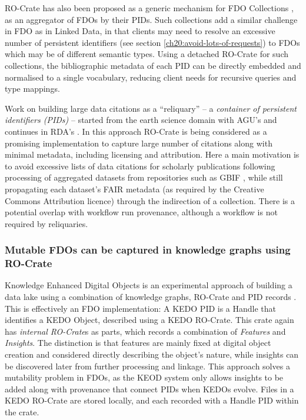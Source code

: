 RO-Crate has also been proposed as a generic mechanism for FDO Collections \cite{Soiland-Reyes 2023d}, as an aggregator of FDOs by their PIDs. Such collections add a similar challenge in FDO as in Linked Data, in that clients may need to resolve an excessive number of persistent identifiers (see section \vref{ch20:avoid-lots-of-requests}) to FDOs which may be of different semantic types. 
Using a detached RO-Crate for such collections, the bibliographic metadata of each PID can be directly embedded and normalised to a single vocabulary, reducing client needs for recursive queries and type mappings. 
 
Work on building large data citations as a ``reliquary'' -- a \emph{container of persistent identifiers (PIDs)} \cite{Buck 2022} -- started from the earth science domain with AGU's  and continues in \acrshort{RDA}'s . In this approach RO-Crate is being considered as a promising implementation to capture large number of citations along with minimal metadata, including licensing and attribution. Here a main motivation is to avoid excessive lists of data citations for scholarly publications following processing of aggregated datasets from repositories such as GBIF \cite{GBIF 2021}, while still propagating each dataset's FAIR metadata (as required by the Creative Commons Attribution licence) through the indirection of a collection. There is a potential overlap with workflow run provenance, although a workflow is not required by reliquaries.


\subsubsection{Mutable FDOs can be captured in knowledge graphs using RO-Crate}
\label{ch61:datalakes}

Knowledge Enhanced Digital Objects  \cite{Luo 2022} is an experimental approach of building a data lake using a combination of knowledge graphs, RO-Crate and PID records \cite{Luo 2023}. This is effectively an FDO implementation: A KEDO PID is a Handle that identifies a KEDO Object, described using a KEDO RO-Crate. This crate again has \emph{internal RO-Crate}s as parts, which records a combination of \emph{Features} and \emph{Insights}. The distinction is that features are mainly fixed at digital object creation and considered directly describing the object's nature, while insights can be discovered later from further processing and linkage. This approach solves a mutability problem in FDOs, as the KEOD system only allows insights to be added along with provenance that connect PIDs when KEDOs evolve. Files in a KEDO RO-Crate are stored locally, and each recorded with a Handle PID within the crate.

